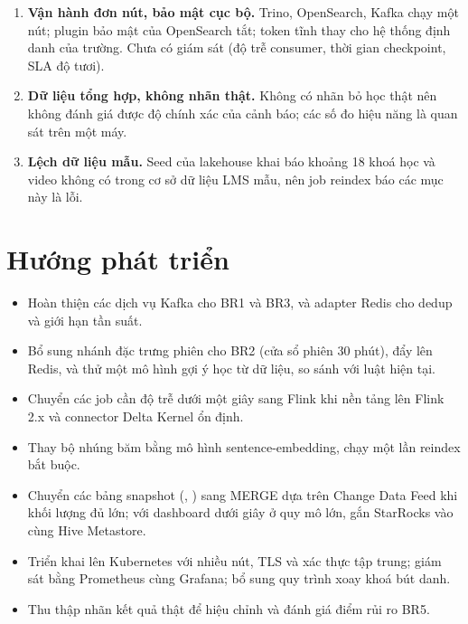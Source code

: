 \begin{enumerate}
  \item \textbf{Vận hành đơn nút, bảo mật cục bộ.} Trino, OpenSearch, Kafka chạy một nút; plugin bảo mật của OpenSearch tắt; token tĩnh thay cho hệ thống định danh của trường. Chưa có giám sát (độ trễ consumer, thời gian checkpoint, SLA độ tươi).
  \item \textbf{Dữ liệu tổng hợp, không nhãn thật.} Không có nhãn bỏ học thật nên không đánh giá được độ chính xác của cảnh báo; các số đo hiệu năng là quan sát trên một máy.
  \item \textbf{Lệch dữ liệu mẫu.} Seed của lakehouse khai báo khoảng 18 khoá học và video không có trong cơ sở dữ liệu LMS mẫu, nên job reindex báo các mục này là lỗi.
\end{enumerate}

\section{Hướng phát triển}

\begin{itemize}
  \item Hoàn thiện các dịch vụ Kafka cho BR1 và BR3, và adapter Redis cho dedup và giới hạn tần suất.
  \item Bổ sung nhánh đặc trưng phiên cho BR2 (cửa sổ phiên 30 phút), đẩy  lên Redis, và thử một mô hình gợi ý học từ dữ liệu, so sánh với luật hiện tại.
  \item Chuyển các job cần độ trễ dưới một giây sang Flink khi nền tảng lên Flink 2.x và connector Delta Kernel ổn định.
  \item Thay bộ nhúng băm bằng mô hình sentence-embedding, chạy một lần reindex bắt buộc.
  \item Chuyển các bảng snapshot (, ) sang MERGE dựa trên Change Data Feed khi khối lượng đủ lớn; với dashboard dưới giây ở quy mô lớn, gắn StarRocks vào cùng Hive Metastore.
  \item Triển khai lên Kubernetes với nhiều nút, TLS và xác thực tập trung; giám sát bằng Prometheus cùng Grafana; bổ sung quy trình xoay khoá bút danh.
  \item Thu thập nhãn kết quả thật để hiệu chỉnh và đánh giá điểm rủi ro BR5.
\end{itemize}
